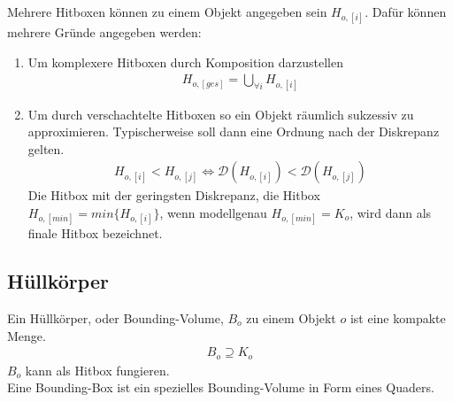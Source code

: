 Mehrere Hitboxen können zu einem Objekt angegeben sein $H_{o, [i]}$. Dafür können mehrere Gründe angegeben werden:
\begin{enumerate}
\item Um komplexere Hitboxen durch Komposition darzustellen 
\begin{align}
H_{o, [ges]} = \bigcup_{\forall i}H_{o, [i]}
\end{align}
\item Um durch verschachtelte Hitboxen so ein Objekt räumlich sukzessiv zu approximieren.
Typischerweise soll dann eine Ordnung nach der Diskrepanz gelten.
\begin{align}
H_{o, [i]} < H_{o, [j]} \Leftrightarrow \mathcal{D}(H_{o, [i]}) < \mathcal{D}(H_{o, [j]})
\end{align}
Die Hitbox mit der geringsten Diskrepanz, die Hitbox $H_{o, [min]}=min\{H_{o, [i]}\}$, wenn modellgenau $H_{o, [min]} = K_o$, wird dann als finale Hitbox bezeichnet.
\end{enumerate}


\subsection{Hüllkörper}
\label{sec:bounding_volume}

Ein Hüllkörper, oder Bounding-Volume, $B_o$ zu einem Objekt $o$ ist eine kompakte Menge.
\begin{align}
B_o \supseteq K_o
\end{align}
$B_o$ kann als Hitbox fungieren.\\
Eine Bounding-Box ist ein spezielles Bounding-Volume in Form eines Quaders.\\

